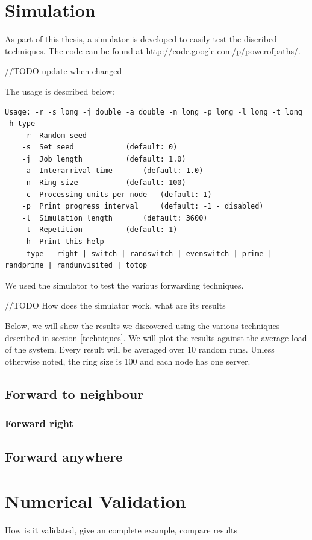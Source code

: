 \documentclass[10pt,a4paper]{article}
\begin{document}
\section{Simulation}
As part of this thesis, a simulator is developed to easily test the discribed techniques. The code can be found at \url{http://code.google.com/p/powerofpaths/}.

//TODO update when changed

The usage is described below:
\begin{lstlisting}
Usage: -r -s long -j double -a double -n long -p long -l long -t long -h type
	-r	Random seed
	-s	Set seed			(default: 0)
	-j	Job length			(default: 1.0)
	-a	Interarrival time		(default: 1.0)
	-n	Ring size			(default: 100)
	-c	Processing units per node	(default: 1)
	-p	Print progress interval		(default: -1 - disabled)
	-l	Simulation length		(default: 3600)
	-t	Repetition			(default: 1)
	-h	Print this help
	 type	right | switch | randswitch | evenswitch | prime | randprime | randunvisited | totop
\end{lstlisting}

We used the simulator to test the various forwarding techniques.

//TODO How does the simulator work, what are its results

Below, we will show the results we discovered using the various techniques described in section \ref{techniques}. We will plot the results against the average load of the system. Every result will be averaged over 10 random runs. Unless otherwise noted, the ring size is 100 and each node has one server.
\subsection{Forward to neighbour}
\subsubsection{Forward right}


\subsection{Forward anywhere}

\section{Numerical Validation}
How is it validated, give an complete example, compare results
\end{document}
